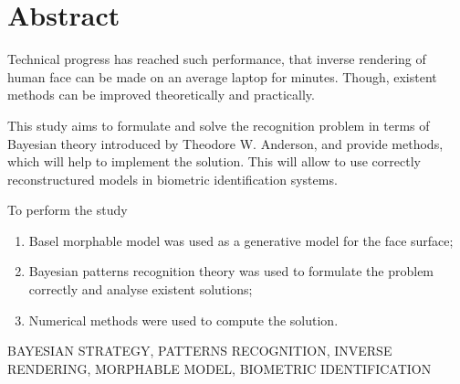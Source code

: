 \chapter*{Abstract}

Technical progress has reached such performance,
that inverse rendering of human face can be made on an average laptop
for minutes.
Though,
existent methods can be improved theoretically and practically.

This study aims to formulate and solve the recognition problem
in terms of Bayesian theory introduced by Theodore W. Anderson,
and provide methods, which will help to implement the solution.
This will allow to use correctly reconstructured models
in biometric identification systems.

To perform the study
\begin{enumerate}
  \item
    Basel morphable model was used as a generative model for the face surface;
  \item
    Bayesian patterns recognition theory was used
    to formulate the problem correctly and analyse existent solutions;
  \item
    Numerical methods were used to compute the solution.
\end{enumerate}

\MakeUppercase{Bayesian strategy, patterns recognition,
 inverse rendering, morphable model,
biometric identification}
